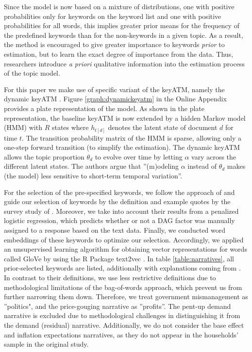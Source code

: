 Since the model is now based on a mixture of distributions, one with positive probabilities only for keywords on the keyword list and one with positive probabilities for all words, this implies greater prior means for the frequency of the predefined keywords than for the non-keywords in a given topic. As a result, the method is encouraged to give greater importance to keywords \textit{prior} to estimation, but to learn the exact degree of importance from the data. Thus, researchers introduce \textit{a priori} qualitative information into the estimation process of the topic model. 

For this paper we make use of specific variant of the \textsf{keyATM}, namely the \textsf{dynamic keyATM} \citep[22 ff.]{Eshima.2020}. Figure \ref{graph:dynamickeyatm} in the Online Appendix provides a plate representation of the model. As shown in the plate representation, the baseline \textsf{keyATM} is now extended by a hidden Markov model (HMM) with $R$ states where $h_{t[d]}$ denotes the latent state of document $d$ for time $t$. The transition probability matrix of the HMM is sparse, allowing only a one-step forward transition (to simplify the estimation). The \textsf{dynamic keyATM} allows the topic proportion $\theta_d$ to evolve over time by letting $\alpha$ vary across the different latent states. The authors argue that ''(m)odeling $\alpha$ instead of $\theta_d$ makes (the model) less sensitive to short-term temporal variation''. 

For the selection of the pre-specified keywords, we follow the approach of \cite{Eshima.2023} and guide our selection of keywords by the definition and example quotes by the survey study of \cite{Andre.2023}. Moreover, we take into account their results from a penalized logistic regression, which predicts whether or not a DAG factor was manually assigned to a response based on the text data. Finally, we conducted word embeddings of these keywords to optimize our selection. Accordingly, we applied an unsupervised learning algorithm for obtaining vector representations for words called GloVe by using the R Package \textsf{text2vec} \citep{text2vec.2022}. In table \ref{table:narratives}, all prior-selected keywords are listed, additionally with explanations coming from \cite{Andre.2023}. In contrast to their definitions, we use less restrictive definitions due to methodological limitations of the bag-of-words approach, which prevent us from further narrowing them down. Therefore, we treat government mismanagement as ''politics", and the price-gouging narrative as ''profits''. The pent-up demand narrative is excluded due to methodological challenges in distinguishing it from the demand (residual) narrative. Additionally, we do not consider the base effect and inflation expectations narratives, as they do not appear in the households' sample in the original study.

